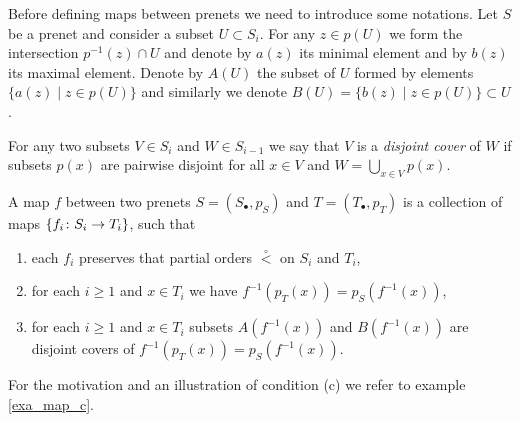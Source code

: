 \documentclass[letterpaper,12pt,leqno]{article}
\numberwithin{equation}{theorem}
\def\lesub{\mathop{<}\limits}
\def\pless{\lesub^\circ}
\begin{document}
\begin{nparagraph}
\label{par_AB_notation}
Before defining maps between prenets we need to introduce some notations. Let $S$ be a prenet and consider a subset $U \subset S_i$. For any $z \in p(U)$ we form
the intersection $p^{-1}(z) \cap U$ and denote by $a(z)$ its minimal element and by $b(z)$ its maximal element. Denote by $A(U)$ the subset of $U$ formed by elements
$\{a(z) \mid z \in p(U)\}$ and similarly we denote $B(U) = \{b(z) \mid z \in p(U)\} \subset U$.

For any two subsets $V \in S_i$ and $W \in S_{i-1}$ we say that $V$ is a {\em disjoint cover} of $W$ if subsets $p(x)$ are pairwise disjoint for all $x \in V$ and $W = \bigcup_{x \in V} p(x)$.
\end{nparagraph}

\begin{definition}
\label{def_prenet_map}
A map $f$ between two prenets $S = (S_\bullet, p_S)$ and $T = (T_\bullet, p_T)$ is a collection of maps $\{f_i\colon S_i \to T_i\}$, such that
\begin{enumerate}[label=\alph*)]
\item each $f_i$ preserves that partial orders $\pless$ on $S_i$ and $T_i$,
\item for each $i \ge 1$ and $x \in T_i$ we have $f^{-1}(p_T(x)) = p_S(f^{-1}(x))$,
\item for each $i \ge 1$ and $x \in T_i$ subsets $A(f^{-1}(x))$ and $B(f^{-1}(x))$ are disjoint covers of $f^{-1}(p_T(x)) = p_S(f^{-1}(x))$.
\end{enumerate}
\end{definition}

For the motivation and an illustration of condition (c) we refer to example \ref{exa_map_c}.
\end{document}
